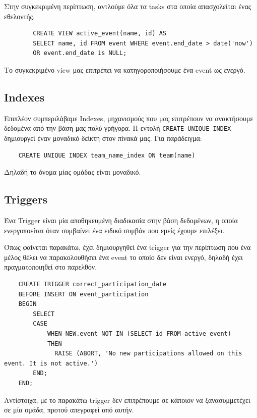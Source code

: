 \documentclass[manuscript,screen,review]{acmart}
\newcommand{\en}[1]{\foreignlanguage{english}{#1}}
\newcommand{\src}[1]{{\tt\en{#1}}}
\begin{document}
Στην συγκεκριμένη περίπτωση, αντλούμε όλα τα \en{tasks} στα οποία απασχολείται ένας εθελοντής.

    \begin{lstlisting}
        CREATE VIEW active_event(name, id) AS
        SELECT name, id FROM event WHERE event.end_date > date('now') 
        OR event.end_date is NULL;
    \end{lstlisting}

Το συγκεκριμένο \en{view} μας επιτρέπει να κατηγοροποιήσουμε ένα \en{event} ως ενεργό.

\subsection{\en{Indexes}}
Επιπλέον συμπεριλάβαμε \en{Indexes}, μηχανισμούς που μας επιτρέπουν να ανακτήσουμε δεδομένα από την βάση μας πολύ γρήγορα. 
Η εντολή \src{CREATE UNIQUE INDEX} δημιουργεί έναν μοναδικό δείκτη στον πίνακά μας. Για παράδειγμα:

    \begin{lstlisting}
    CREATE UNIQUE INDEX team_name_index ON team(name)
    \end{lstlisting}
Δηλαδή το όνομα μίας ομάδας είναι μοναδικό.

\subsection{\en{Triggers}}
Ένα \en{Trigger} είναι μία αποθηκευμένη διαδικασία στην βάση δεδομένων, η οποία ενεργοποείται όταν συμβαίνει ένα ειδικό συμβάν που εμείς έχουμε επιλέξει.

Όπως φαίνεται παρακάτω, έχει δημιουργηθεί ένα \en{trigger} για την περίπτωση που ένα μέλος θέλει να παρακολουθήσει ένα \en{event} το οποίο δεν είναι ενεργό, δηλαδή έχει πραγματοποιηθεί στο παρελθόν.

    \begin{lstlisting}
    CREATE TRIGGER correct_participation_date 
    BEFORE INSERT ON event_participation
    BEGIN 
        SELECT 
        CASE 
            WHEN NEW.event NOT IN (SELECT id FROM active_event) 
            THEN 
              RAISE (ABORT, 'No new participations allowed on this event. It is not active.')
        END;
    END;
    \end{lstlisting}

Αντίστοιχα, με το παρακάτω \en{trigger} δεν επιτρέπουμε σε κάποιον να ξανασυμμετέχει σε μία ομάδα, προτού απεγραφεί από αυτήν.
\end{document}
